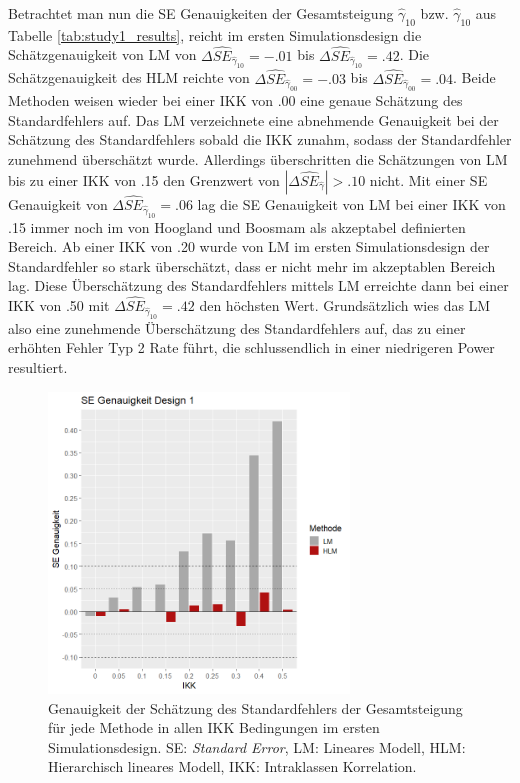 \documentclass[12pt]{article}\usepackage[]{graphicx}\usepackage[]{color}
\begin{document}
Betrachtet man nun die SE Genauigkeiten der Gesamtsteigung $\widehat{\gamma}_{10}$ bzw. $\widehat{\gamma}_{10}$ aus Tabelle \ref{tab:study1_results}, reicht im ersten Simulationsdesign die Schätzgenauigkeit von LM von $\Delta\widehat{SE}_{\widehat{\gamma}_{10}} = -.01$ bis $\Delta\widehat{SE}_{\widehat{\gamma}_{10}} = .42$. Die Schätzgenauigkeit des HLM reichte von $\Delta\widehat{SE}_{\widehat{\gamma}_{00}} = -.03$ bis $\Delta\widehat{SE}_{\widehat{\gamma}_{00}} = .04$. Beide Methoden weisen wieder bei einer IKK von .00 eine genaue Schätzung des Standardfehlers auf. Das LM verzeichnete eine abnehmende Genauigkeit bei der Schätzung des Standardfehlers sobald die IKK zunahm, sodass der Standardfehler zunehmend überschätzt wurde. Allerdings überschritten die Schätzungen von LM bis zu einer IKK von .15 den Grenzwert von $|\Delta\widehat{SE}_{\widehat{\gamma}}| > .10$ nicht. Mit einer SE Genauigkeit von $\Delta\widehat{SE}_{\widehat{\gamma}_{10}} = .06$ lag die SE Genauigkeit von LM bei einer IKK von .15 immer noch im von Hoogland und Boosmam \citeyearpar{hooglandboosma1998robustness} als akzeptabel definierten Bereich. Ab einer IKK von .20 wurde von LM im ersten Simulationsdesign der Standardfehler so stark überschätzt, dass er nicht mehr im akzeptablen Bereich lag. Diese Überschätzung des Standardfehlers mittels LM erreichte dann bei einer IKK von .50 mit $\Delta\widehat{SE}_{\widehat{\gamma}_{10}} = .42$ den höchsten Wert. Grundsätzlich wies das LM also eine zunehmende Überschätzung des Standardfehlers auf, das zu einer erhöhten Fehler Typ 2 Rate führt, die schlussendlich in einer niedrigeren Power resultiert. 
\begin{figure}[t!]
\centering
\captionsetup{width=8cm}
\includegraphics[width=8cm, height=8cm]{./figures/se_genauigkeit_design1}
\caption{Genauigkeit der Schätzung des Standardfehlers der Gesamtsteigung für jede Methode in allen IKK Bedingungen im ersten Simulationsdesign. SE: \textit{Standard Error}, LM: Lineares Modell, HLM: Hierarchisch lineares Modell, IKK: Intraklassen Korrelation.}
\label{fig:se_genauigkeit_design1}
\end{figure}
\end{document}
